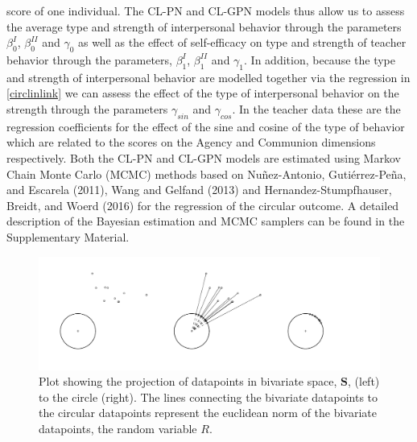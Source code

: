\documentclass[man,mask]{apa6}
\begin{document}
score of one individual. The CL-PN and CL-GPN models thus allow us to assess the
average type and strength of interpersonal behavior through the parameters
\(\beta_{0}^{I}\), \(\beta_{0}^{II}\) and \(\gamma_0\) as well as the effect of
self-efficacy on type and strength of teacher behavior through the parameters,
\(\beta_{1}^{I}\), \(\beta_{1}^{II}\) and \(\gamma_1\). In addition, because the type
and strength of interpersonal behavior are modelled together via the regression
in \eqref{circlinlink} we can assess the effect of the type of interpersonal
behavior on the strength through the parameters \(\gamma_{sin}\) and
\(\gamma_{cos}\). In the teacher data these are the regression coefficients for
the effect of the sine and cosine of the type of behavior which are related to
the scores on the Agency and Communion dimensions respectively.\newline
\indent Both the CL-PN and CL-GPN models are estimated using Markov Chain Monte
Carlo (MCMC) methods based on Nuñez-Antonio, Gutiérrez-Peña, and Escarela (2011), Wang and Gelfand (2013) and
Hernandez-Stumpfhauser, Breidt, and Woerd (2016) for the regression of the circular outcome. A detailed
description of the Bayesian estimation and MCMC samplers can be found in the
Supplementary Material.

\begin{figure}
\centering
\includegraphics[width = \textwidth]{Plots/plotprojecting.pdf}
\caption{Plot showing the projection of datapoints in bivariate space, $\boldsymbol{S}$, (left) to the circle (right). The lines connecting the bivariate datapoints to the circular datapoints represent the euclidean norm of the bivariate datapoints, the random variable $R$.}
\label{projection}
\end{figure}
\end{document}

